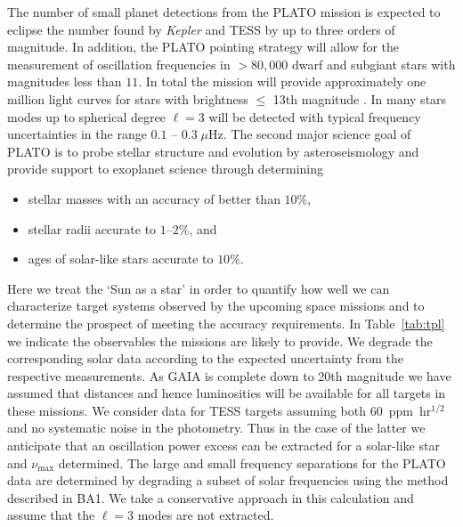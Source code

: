 The number of small planet detections from the PLATO mission is expected to eclipse the number found by \emph{Kepler}
and TESS by up to three orders of magnitude. In addition, the PLATO pointing strategy will allow for the measurement of oscillation frequencies in $> 80,000$ dwarf and subgiant stars with magnitudes less than $11$.  In total the mission will provide approximately one million light curves for stars with brightness $\le$ 13th magnitude \citep{2014ExA....38..249R}. In many stars modes up to spherical degree ${\ell =3}$ will be detected with typical frequency uncertainties in the range  $0.1$ -- $0.3\;\mu$Hz. The second major science goal of PLATO is to 
probe stellar structure and evolution by asteroseismology and provide support to exoplanet science through determining
\begin{itemize}
\item stellar masses with an accuracy of better than  $10\%$,
\item stellar radii accurate to $1$--$2\%$, and
\item ages of solar-like stars accurate to  $10\%$.
\end{itemize}

Here we treat the `Sun as a star' in order to quantify how well we can characterize target systems observed by the 
upcoming space missions and to determine the prospect of meeting the accuracy requirements.  
In Table~\ref{tab:tpl} we indicate the observables the missions are likely to provide. 
We degrade the corresponding solar data according to the expected uncertainty from the respective measurements.   
As GAIA is complete down to 20th magnitude we have assumed that distances and hence luminosities will be available for all targets in these missions. We consider data for TESS targets assuming both $60$~ppm~hr$^{1/2}$ and no systematic noise in the photometry. Thus in the case of the latter we anticipate that an oscillation power excess can be extracted for a solar-like star and $\nu_{\max}$ determined. The large and small frequency separations for the PLATO data are determined by degrading a subset of solar frequencies using the method described in BA1. We take a conservative approach in this calculation and assume that the ${\ell=3}$ modes are not extracted.




